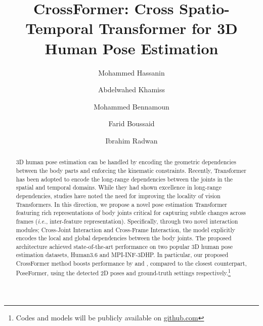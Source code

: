 \documentclass[runningheads]{llncs}
\begin{document}
\pagestyle{headings}
\mainmatter
\def\ECCVSubNumber{4193}  

\title{CrossFormer: Cross Spatio-Temporal Transformer for 3D Human Pose Estimation} 


\author{Mohammed Hassanin \and
Abdelwahed Khamiss\and
Mohammed Bennamoun\and
 Farid Boussaid\and
Ibrahim Radwan}




\begin{comment}
\end{comment}




\maketitle
\begin{abstract}
3D human pose estimation can be handled by encoding the geometric dependencies between the body parts and enforcing the kinematic constraints. Recently, Transformer has been adopted to encode the long-range dependencies between the joints in the spatial and temporal domains. While they had shown excellence in long-range dependencies, studies have noted the need for improving the locality of vision Transformers. In this direction, we propose a novel pose estimation Transformer featuring rich representations of body joints critical for capturing subtle changes across frames (\textit{i.e.}, inter-feature representation). Specifically, through two novel interaction modules; Cross-Joint Interaction and Cross-Frame Interaction, the model explicitly encodes the local and global dependencies between the body joints. The proposed architecture achieved state-of-the-art performance on two popular 3D human pose estimation datasets, Human3.6 and MPI-INF-3DHP. In particular, our proposed CrossFormer method boosts performance by  and , compared to the closest counterpart, PoseFormer, using the detected 2D poses and ground-truth settings respectively.\footnote{Codes and models will be publicly available on \url{github.com}} 
\end{abstract}
\end{document}
